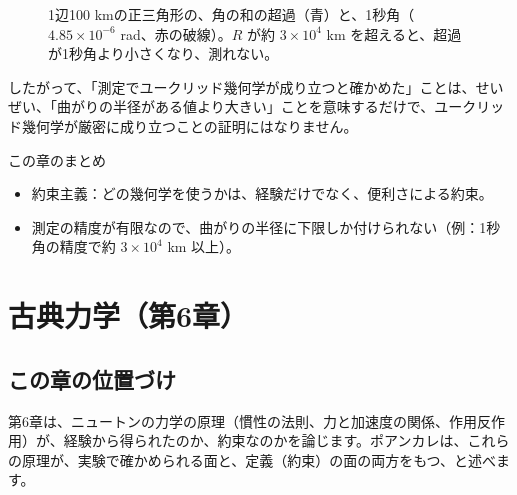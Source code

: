 \documentclass[a4paper,11pt,openany]{ltjsbook}
\begin{document}
\begin{figure}[htbp]
\centering
{}
\caption{1辺100 kmの正三角形の、角の和の超過（青）と、1秒角（$4.85\times10^{-6}$ rad、赤の破線）。$R$ が約 $3\times10^4$ km を超えると、超過が1秒角より小さくなり、測れない。}
\end{figure}

したがって、「測定でユークリッド幾何学が成り立つと確かめた」ことは、せいぜい、「曲がりの半径がある値より大きい」ことを意味するだけで、ユークリッド幾何学が厳密に成り立つことの証明にはなりません。

\begin{pointbox}{この章のまとめ}
\begin{itemize}[leftmargin=*]
\item 約束主義：どの幾何学を使うかは、経験だけでなく、便利さによる約束。
\item 測定の精度が有限なので、曲がりの半径に下限しか付けられない（例：1秒角の精度で約 $3\times10^4$ km 以上）。
\end{itemize}
\end{pointbox}

\chapter{古典力学（第6章）}

\section{この章の位置づけ}

第6章は、ニュートンの力学の原理（慣性の法則、力と加速度の関係、作用反作用）が、経験から得られたのか、約束なのかを論じます。ポアンカレは、これらの原理が、実験で確かめられる面と、定義（約束）の面の両方をもつ、と述べます。
\end{document}
